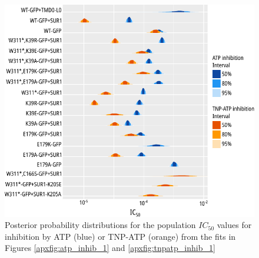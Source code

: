 \begin{figure}[h]
	\centering
	\includegraphics[width=\textwidth]{all_inhibition_params.pdf}
	\caption[Nucleotide inhibition IC\textsubscript{50} posterior distributions]{
	{\bf{}}
	Posterior probability distributions for the population $IC_{50}$ values for inhibition by ATP (blue) or TNP-ATP (orange) from the fits in Figures \ref{apxfig:atp_inhib_1} and \ref{apxfig:tnpatp_inhib_1}
	}
	\label{apxfig:inhib_params}
\end{figure}

